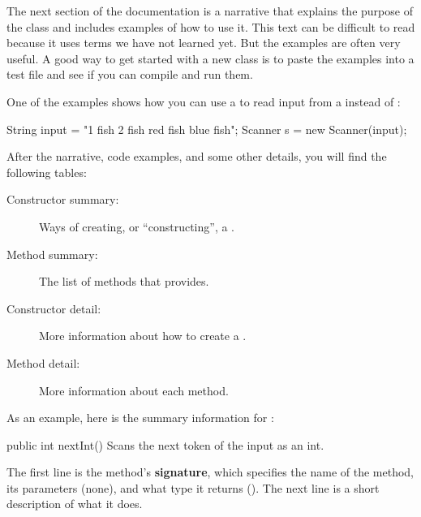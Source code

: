 
The next section of the documentation is a narrative that explains the purpose of the class and includes examples of how to use it.
This text can be difficult to read because it uses terms we have not learned yet.
But the examples are often very useful.
A good way to get started with a new class is to paste the examples into a test file and see if you can compile and run them.

One of the examples shows how you can use a  to read input from a  instead of :

\begin{code}
String input = "1 fish 2 fish red fish blue fish";
Scanner s = new Scanner(input);
\end{code}

After the narrative, code examples, and some other details, you will find the following tables:

\begin{description}

\item[Constructor summary:]
Ways of creating, or ``constructing'', a .

\item[Method summary:]
The list of methods that  provides.

\item[Constructor detail:]
More information about how to create a .

\item[Method detail:]
More information about each method.

\end{description}

As an example, here is the summary information for :

\begin{stdout}
public int nextInt()
Scans the next token of the input as an int.
\end{stdout}


The first line is the method's {\bf signature}, which specifies the name of the method, its parameters (none), and what type it returns ().
The next line is a short description of what it does.


